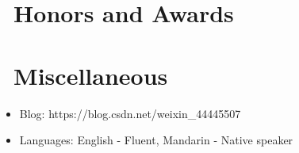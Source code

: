 \documentclass[a4paper,10pt]{resume}
\begin{document}
\section{\faHeartO\ Honors and Awards}

\section{\faInfo\ Miscellaneous}
\begin{itemize}[parsep=0.5ex]
  \item Blog: https://blog.csdn.net/weixin\_44445507
  \item Languages: English - Fluent, Mandarin - Native speaker
\end{itemize}

%
%
\end{document}
